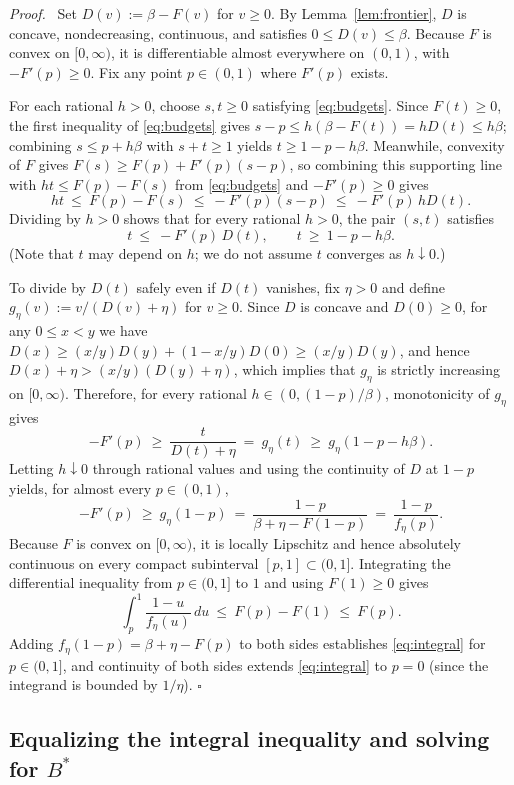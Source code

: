 \documentclass[11pt,letterpaper]{article}
\newenvironment{proof}[1][Proof]{\par\smallskip\noindent\textit{#1.}\ \ignorespaces}{\hfill$\square$\par\medskip}
\begin{document}
\begin{proof}
Set $D(v) := \beta - F(v)$ for $v\ge 0$. By Lemma~\ref{lem:frontier}, $D$ is concave, nondecreasing, continuous, and satisfies $0\le D(v)\le\beta$. Because $F$ is convex on $[0,\infty)$, it is differentiable almost everywhere on $(0,1)$, with $-F'(p)\ge 0$. Fix any point $p\in(0,1)$ where $F'(p)$ exists.

For each rational $h>0$, choose $s,t\ge 0$ satisfying \eqref{eq:budgets}. Since $F(t)\ge 0$, the first inequality of \eqref{eq:budgets} gives $s - p \le h(\beta - F(t)) = h D(t)\le h\beta$; combining $s\le p+h\beta$ with $s+t\ge 1$ yields $t\ge 1-p-h\beta$. Meanwhile, convexity of $F$ gives $F(s)\ge F(p)+F'(p)(s-p)$, so combining this supporting line with $ht\le F(p)-F(s)$ from \eqref{eq:budgets} and $-F'(p)\ge 0$ gives
\[
  h t\ \le\ F(p) - F(s)\ \le\ -F'(p)(s-p)\ \le\ -F'(p)\,h D(t).
\]
Dividing by $h>0$ shows that for every rational $h>0$, the pair $(s,t)$ satisfies
\[
  t\ \le\ -F'(p)\,D(t),\qquad t\ \ge\ 1 - p - h\beta .
\]
(Note that $t$ may depend on $h$; we do not assume $t$ converges as $h\downarrow 0$.)

To divide by $D(t)$ safely even if $D(t)$ vanishes, fix $\eta>0$ and define $g_\eta(v) := v/(D(v)+\eta)$ for $v\ge 0$. Since $D$ is concave and $D(0)\ge 0$, for any $0\le x<y$ we have $D(x)\ge (x/y)D(y) + (1-x/y)D(0)\ge (x/y)D(y)$, and hence $D(x)+\eta > (x/y)(D(y)+\eta)$, which implies that $g_\eta$ is strictly increasing on $[0,\infty)$. Therefore, for every rational $h\in(0,(1-p)/\beta)$, monotonicity of $g_\eta$ gives
\[
  -F'(p)\ \ge\ \frac{t}{D(t)+\eta}\ =\ g_\eta(t)\ \ge\ g_\eta(1-p-h\beta).
\]
Letting $h\downarrow 0$ through rational values and using the continuity of $D$ at $1-p$ yields, for almost every $p\in(0,1)$,
\[
  -F'(p)\ \ge\ g_\eta(1-p)\ =\ \frac{1-p}{\beta+\eta-F(1-p)}\ =\ \frac{1-p}{f_\eta(p)}.
\]
Because $F$ is convex on $[0,\infty)$, it is locally Lipschitz and hence absolutely continuous on every compact subinterval $[p,1]\subset(0,1]$. Integrating the differential inequality from $p\in(0,1]$ to $1$ and using $F(1)\ge 0$ gives
\[
  \int_p^1 \frac{1-u}{f_\eta(u)}\,du\ \le\ F(p) - F(1)\ \le\ F(p).
\]
Adding $f_\eta(1-p) = \beta+\eta-F(p)$ to both sides establishes \eqref{eq:integral} for $p\in(0,1]$, and continuity of both sides extends \eqref{eq:integral} to $p=0$ (since the integrand is bounded by $1/\eta$).
\end{proof}

\subsection{Equalizing the integral inequality and solving for \texorpdfstring{$B^*$}{B*}}
\end{document}
